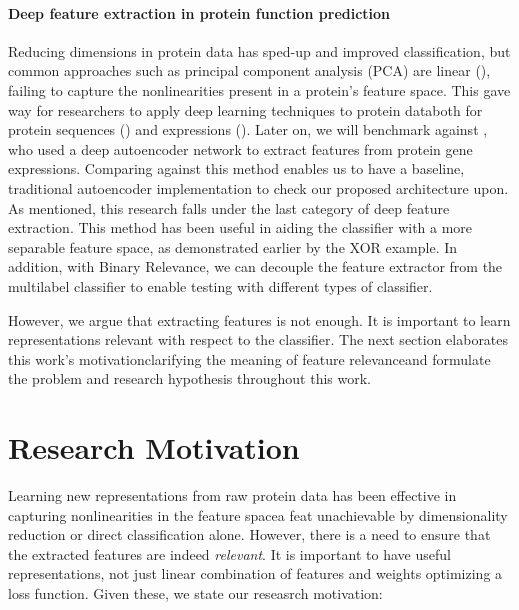 \paragraph{Deep feature extraction in protein function prediction}
Reducing dimensions in protein data has sped-up and improved classification,
but common approaches such as principal component analysis (PCA) are linear
(\cite{bengio2013representation}), failing to capture the nonlinearities
present in a protein's feature space. This gave way for researchers to apply
deep learning techniques to protein data\textemdash both for protein
sequences (\cite{bhola2014machine,kulmanov2017deepgo, zou2017protein}) and
expressions (\cite{baldi2001bioinformatics, chicco2014deep}). Later on, we
will benchmark against \cite{chicco2014deep}, who used a deep autoencoder
network to extract features from protein gene expressions. Comparing against
this method enables us to have a baseline, traditional autoencoder
implementation to check our proposed architecture upon. As mentioned, this
research falls under the last category of deep feature extraction. This
method has been useful in aiding the classifier with a more separable feature
space, as demonstrated earlier by the XOR example. In addition, with Binary
Relevance, we can decouple the feature extractor from the multilabel
classifier to enable testing with different types of classifier.

\par However, we argue that extracting features is not enough. It is
important to learn representations relevant with respect to the classifier.
The next section elaborates this work's motivation\textemdash clarifying the
meaning of feature relevance\textemdash and formulate the problem and
research hypothesis throughout this work.

\section{Research Motivation}
\label{Motivation}

\par Learning new representations from raw protein data has been effective in
capturing nonlinearities in the feature space\textemdash a feat unachievable
by dimensionality reduction or direct classification alone. However, there is
a need to ensure that the extracted features are indeed \textit{relevant}. It
is important to have useful representations, not just linear combination of
features and weights optimizing a loss function. Given these, we state our
reseasrch motivation:

